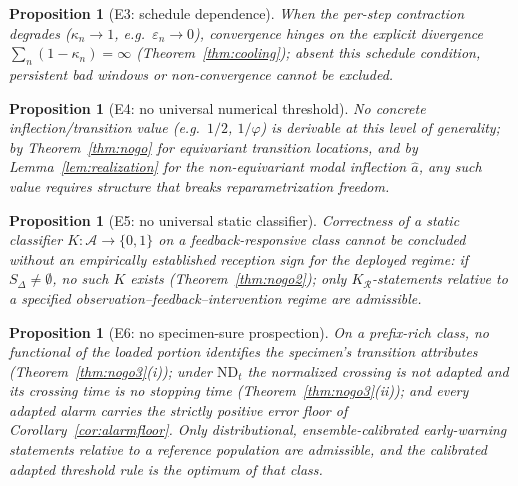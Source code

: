 \documentclass[11pt]{article}
\theoremstyle{plain}
\newtheorem{proposition}[theorem]{Proposition}
\theoremstyle{definition}
\theoremstyle{remark}
\begin{document}
\begin{proposition}[E3: schedule dependence]\label{E3}
When the per-step contraction degrades ($\kappa_n\to1$, e.g.\ $\varepsilon_n\to0$), convergence hinges on the explicit divergence $\sum_n(1-\kappa_n)=\infty$ (Theorem~\ref{thm:cooling}); absent this schedule condition, persistent bad windows or non-convergence cannot be excluded.
\end{proposition}

\begin{proposition}[E4: no universal numerical threshold]\label{E4}
No concrete inflection/transition value (e.g.\ $1/2$, $1/\varphi$) is derivable at this level of generality; by Theorem~\ref{thm:nogo} for equivariant transition locations, and by Lemma~\ref{lem:realization} for the non-equivariant modal inflection $\hat a$, any such value requires structure that breaks reparametrization freedom.
\end{proposition}

\begin{proposition}[E5: no universal static classifier]\label{E5}
Correctness of a static classifier $K:\mathcal A\to\{0,1\}$ on a feedback-responsive class cannot be concluded without an empirically established reception sign for the deployed regime: if $S_\Delta\ne\emptyset$, no such $K$ exists (Theorem~\ref{thm:nogo2}); only $K_{\mathcal R}$-statements relative to a specified observation--feedback--intervention regime are admissible.
\end{proposition}

\begin{proposition}[E6: no specimen-sure prospection]\label{E6}
On a prefix-rich class, no functional of the loaded portion identifies the specimen's transition attributes (Theorem~\ref{thm:nogo3}(i)); under $\mathrm{ND}_t$ the normalized crossing is not adapted and its crossing time is no stopping time (Theorem~\ref{thm:nogo3}(ii)); and every adapted alarm carries the strictly positive error floor of Corollary~\ref{cor:alarmfloor}. Only distributional, ensemble-calibrated early-warning statements relative to a reference population are admissible, and the calibrated adapted threshold rule is the optimum of that class.
\end{proposition}
\end{document}
